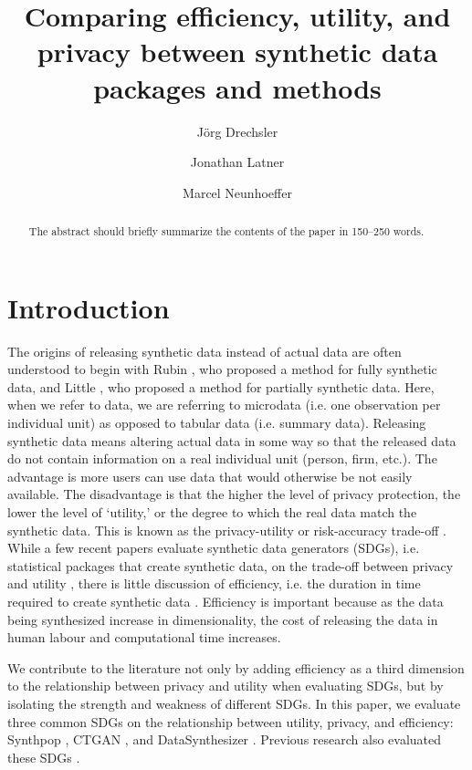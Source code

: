\documentclass[runningheads]{llncs}
\title{Comparing efficiency, utility, and privacy between synthetic data packages and methods}
\author{Jörg Drechsler\inst{1 (\text{\Letter})} \and
Jonathan Latner\inst{1 \orcidlink{0000-0002-1825-0097}} \and
Marcel Neunhoeffer\inst{1 \orcidlink{0000-0002-9137-5785}}}
\institute{Institute for Employment Research, Nuremberg, Germany
\email{{joerg.drechsler,jonathan.latner,marcel.neunhoeffer}@iab.de}}
\begin{document}
\maketitle              %
%
\begin{abstract}
The abstract should briefly summarize the contents of the paper in
150--250 words.

\end{abstract}


\clearpage

\section{Introduction}

The origins of releasing synthetic data instead of actual data are often understood to begin with Rubin \cite{rubin1993statistical}, who proposed a method for fully synthetic data, and Little \cite{little1993statistical}, who proposed a method for partially synthetic data.  Here, when we refer to data, we are referring to microdata (i.e. one observation per individual unit) as opposed to tabular data (i.e. summary data).  Releasing synthetic data means altering actual data in some way so that the released data do not contain information on a real individual unit (person, firm, etc.).  The advantage is more users can use data that would otherwise be not easily available.  The disadvantage is that the higher the level of privacy protection, the lower the level of `utility,' or the degree to which the real data match the synthetic data.  This is known as the privacy-utility or risk-accuracy trade-off \citep{reiter2010releasing}.  While a few recent papers evaluate synthetic data generators (SDGs), i.e. statistical packages that create synthetic data, on the trade-off between privacy and utility \citep{little2022comparing,dankar2021fake}, there is little discussion of efficiency, i.e. the duration in time required to create synthetic data \citep{jordon2022synthetic}.  Efficiency is important because as the data being synthesized increase in dimensionality, the cost of releasing the data in human labour and computational time increases.  

We contribute to the literature not only by adding efficiency as a third dimension to the relationship between privacy and utility when evaluating SDGs, but by isolating the strength and weakness of different SDGs.  In this paper, we evaluate three common SDGs on the relationship between utility, privacy, and efficiency: Synthpop \cite{nowok2016synthpop}, CTGAN \cite{patki2016synthetic}, and DataSynthesizer \cite{ping2017datasynthesizer}.  Previous research also evaluated these SDGs \cite{dankar2021fake,little2022comparing}.  
\end{document}
